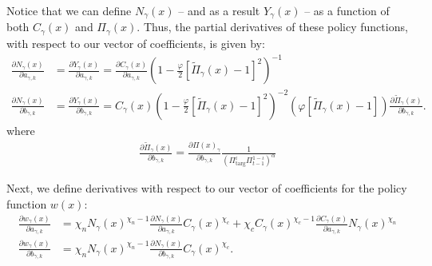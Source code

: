 \documentclass[11pt]{article}
\begin{document}
Notice that we can define $N_{\gamma}(x)$ -- and as a result $Y_{\gamma}(x)$ --  as a function of both $C_{\gamma}(x)$ and $\Pi_{\gamma}(x)$. Thus, the partial derivatives of these policy functions, with respect to our vector of coefficients, is given by: 
\begin{align}
\frac{\partial N_{\gamma}(x)}{\partial a_{\gamma,k}} &= \frac{\partial Y_{\gamma}(x)}{\partial a_{\gamma,k}} = \frac{\partial C_{\gamma}(x)}{\partial a_{\gamma,k}}\left(1-\frac{\varphi}{2}\left[\tilde{\Pi}_{\gamma}(x) -1\right]^2\right)^{-1}\\ 
\frac{\partial N_{\gamma}(x)}{\partial b_{\gamma,k}} &= \frac{\partial Y_{\gamma}(x)}{\partial b_{\gamma,k}} = C_{\gamma}(x)\left(1-\frac{\varphi}{2}\left[\tilde{\Pi}_{\gamma}(x) -1\right]^2\right)^{-2}\left(\varphi\left[\tilde{\Pi}_{\gamma}(x) -1\right]\right)\frac{\partial \tilde{\Pi}_{\gamma}(x)}{\partial b_{\gamma,k}}.
\end{align}
where 
\begin{align}
\frac{\partial \tilde{\Pi}_{\gamma}(x)}{\partial b_{\gamma,k}} = \frac{\partial \Pi(x)_{\gamma}}{\partial b_{\gamma,k}}\frac{1}{\left(\Pi_{\text{targ}}^{\iota}\Pi_{t-1}^{1-\iota}\right)^{\alpha}}
\end{align}

Next, we define derivatives with respect to our vector of coefficients for the policy function $w(x)$: 
\begin{align}
\frac{\partial w_{\gamma}(x)}{\partial a_{\gamma,k}} &=\chi_nN_{\gamma}(x)^{\chi_n-1}\frac{\partial N_{\gamma}(x)}{\partial a_{\gamma,k}}C_{\gamma}(x)^{\chi_c} + \chi_cC_{\gamma}(x)^{\chi_c-1}\frac{\partial C_{\gamma}(x)}{\partial a_{\gamma,k}}N_{\gamma}(x)^{\chi_n} \\ 
\frac{\partial w_{\gamma}(x)}{\partial b_{\gamma,k}} &=\chi_nN_{\gamma}(x)^{\chi_n-1}\frac{\partial N_{\gamma}(x)}{\partial b_{\gamma,k}}C_{\gamma}(x)^{\chi_c}.
\end{align}
\end{document}
